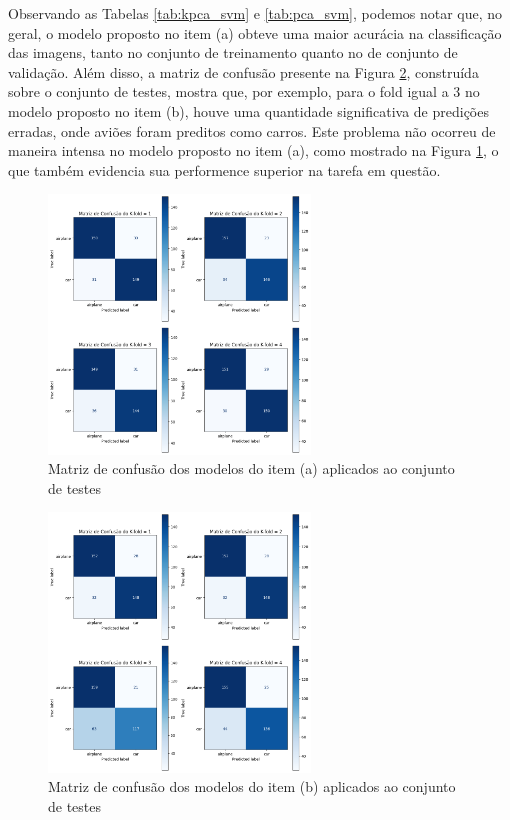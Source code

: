 \documentclass[]{abntex2}
\begin{document}
Observando as Tabelas \ref{tab:kpca_svm} e \ref{tab:pca_svm}, podemos notar que, no geral, o modelo proposto no item (a) obteve uma maior acurácia na classificação das imagens, tanto no conjunto de treinamento quanto no de conjunto de validação. Além disso, a matriz de confusão presente na Figura \ref{fig:1conf_b}, construída sobre o conjunto de testes, mostra que, por exemplo, para o fold igual a 3 no modelo proposto no item (b), houve uma quantidade significativa de predições erradas, onde aviões foram preditos como carros. Este problema não ocorreu de maneira intensa no modelo proposto no item (a), como mostrado na Figura \ref{fig:1conf_a}, o que também evidencia sua performence superior na tarefa em questão.

\begin{figure}[H]
    \centering 
    \includegraphics[width=0.62\textwidth]{imgs/ex1/conf_a.png}
    \caption{Matriz de confusão dos modelos do item (a) aplicados ao conjunto de testes}
    \label{fig:1conf_a} %
\end{figure}

\begin{figure}[H]
    \centering 
    \includegraphics[width=0.62\textwidth]{imgs/ex1/conf_b.png}
    \caption{Matriz de confusão dos modelos do item (b) aplicados ao conjunto de testes}
    \label{fig:1conf_b} %
\end{figure}
\end{document}
